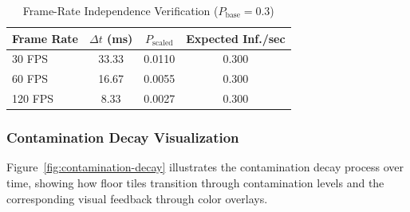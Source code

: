 \begin{table}[t]
\centering
\caption{Frame-Rate Independence Verification ($P_{\text{base}} = 0.3$)}
\label{tab:frame-rate-verification}
\begin{tabular}{@{}lccc@{}}
\toprule
Frame Rate & $\Delta t$ (ms) & $P_{\text{scaled}}$ & Expected Inf./sec \\
\midrule
30 FPS & 33.33 & 0.0110 & 0.300 \\
60 FPS & 16.67 & 0.0055 & 0.300 \\
120 FPS & 8.33 & 0.0027 & 0.300 \\
\bottomrule
\end{tabular}
\end{table}

\subsubsection{Contamination Decay Visualization}

Figure~\ref{fig:contamination-decay} illustrates the contamination decay process over time, showing how floor tiles transition through contamination levels and the corresponding visual feedback through color overlays.

